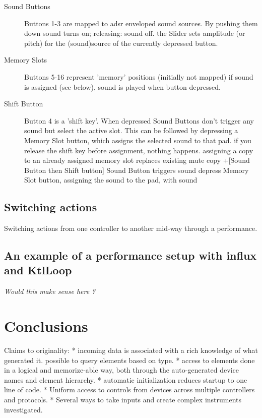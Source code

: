 \documentclass{article}
\begin{document}
\begin{description}
 \item [Sound Buttons] Buttons 1-3 are mapped to adsr enveloped sound sources.
        By pushing them down sound turns on; releasing: sound off.
    the Slider sets amplitude (or pitch) for the (sound)source of the currently depressed button.
 \item [Memory Slots] Buttons 5-16 represent 'memory' positions (initially not mapped)
        if sound is assigned (see below), sound is played when button depressed.
 \item [Shift Button] Button 4 is a 'shift key'. When depressed
        Sound Buttons don't trigger any sound but select the active slot. This can be followed by
        depressing a Memory Slot button, which assigns the selected sound to that pad.
        if you release the shift key before assignment, nothing happens.
        assigning a copy to an already assigned memory slot replaces existing
        mute copy +[Sound Button then Shift button]
        Sound Button triggers sound
        depress Memory Slot button, assigning the sound to the pad, with sound
\end{description}
       
\subsection{Switching actions}
\label{sub:switching_actions}

Switching actions from one controller to another mid-way through a performance.

\subsection{An example of a performance setup with influx and KtlLoop}

\emph{Would this make sense here ?}

\section{Conclusions}
\label{sec:conclusions}



Claims to originality:
* incoming data is associated with a rich knowledge of what generated it. possible to query elements based on type.
* access to elements done in a logical and memorize-able way, both through the auto-generated device names and element hierarchy.
* automatic initialization reduces startup to one line of code.
* Uniform access to controls from devices across multiple controllers and protocols.
* Several ways to take inputs and create complex instruments investigated.
\end{document}
